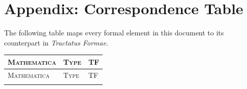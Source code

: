 \documentclass[10pt]{article}
\renewcommand{\small}{\fontsize{9pt}{11pt}\selectfont}
\theoremstyle{definition}
\theoremstyle{plain}
\theoremstyle{remark}
\begin{document}
\section*{Appendix: Correspondence Table}

The following table maps every formal element in this document to its
counterpart in \textit{Tractatus Formae}.

\medskip
{\small
\begin{longtable}{@{}p{50mm}lp{18mm}@{}}
\toprule
\textsc{Mathematica} & \textsc{Type} & \textsc{TF} \\
\midrule
\endfirsthead
\toprule
\textsc{Mathematica} & \textsc{Type} & \textsc{TF} \\
\midrule
\endhead
\bottomrule
\endfoot


\end{longtable}}
\end{document}
